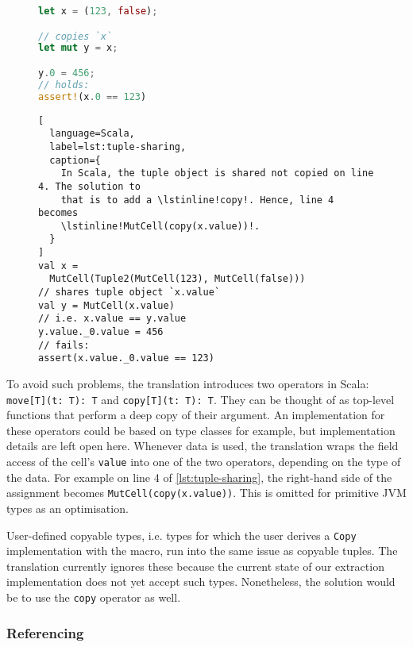 \begin{figure}[hbt]
\noindent\begin{minipage}[t]{.3\textwidth}
\begin{lstlisting}[language=Rust, caption={The tuple is copied on line 4.}, label={lst:tuple-share}]
let x = (123, false);

// copies `x`
let mut y = x;

y.0 = 456;
// holds:
assert!(x.0 == 123)
\end{lstlisting}
\end{minipage}\hfill
\begin{minipage}[t]{.67\textwidth}
\begin{lstlisting}[
  language=Scala,
  label=lst:tuple-sharing,
  caption={
    In Scala, the tuple object is shared not copied on line 4. The solution to
    that is to add a \lstinline!copy!. Hence, line 4 becomes
    \lstinline!MutCell(copy(x.value))!.
  }
]
val x =
  MutCell(Tuple2(MutCell(123), MutCell(false)))
// shares tuple object `x.value`
val y = MutCell(x.value)
// i.e. x.value == y.value
y.value._0.value = 456
// fails:
assert(x.value._0.value == 123)
\end{lstlisting}
\end{minipage}
\end{figure}


To avoid such problems, the translation introduces two operators in Scala:
\passthrough{\lstinline!move[T](t: T): T!} and
\passthrough{\lstinline!copy[T](t: T): T!}. They can be thought of as top-level
functions that perform a deep copy of their argument. An implementation for
these operators could be based on type classes for example, but implementation
details are left open here. Whenever data is used, the translation wraps the
field access of the cell's \lstinline!value! into one of the two operators,
depending on the type of the data. For example on line 4 of
\autoref{lst:tuple-sharing}, the right-hand side of the assignment becomes
\lstinline!MutCell(copy(x.value))!. This is omitted for primitive JVM types as
an optimisation.

User-defined copyable types, i.e. types for which the user derives a
\lstinline!Copy! implementation with the macro, run into the same issue as
copyable tuples. The translation currently ignores these because the current
state of our extraction implementation does not yet accept such types.
Nonetheless, the solution would be to use the \lstinline!copy! operator as well.

\subsubsection{Referencing}

